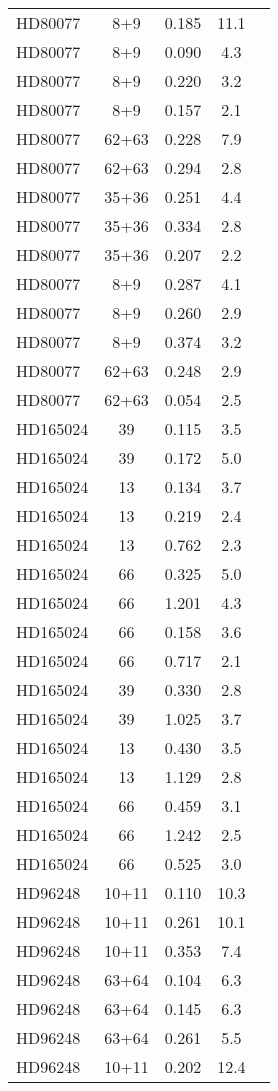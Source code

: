 \begin{table*}
\begin{tabular}{l c c c c}
HD80077 & 8+9 & 0.185 & 11.1\\ 
HD80077 & 8+9 & 0.090 & 4.3\\ 
HD80077 & 8+9 & 0.220 & 3.2\\ 
HD80077 & 8+9 & 0.157 & 2.1\\ 
HD80077 & 62+63 & 0.228 & 7.9\\ 
HD80077 & 62+63 & 0.294 & 2.8\\ 
HD80077 & 35+36 & 0.251 & 4.4\\ 
HD80077 & 35+36 & 0.334 & 2.8\\ 
HD80077 & 35+36 & 0.207 & 2.2\\ 
HD80077 & 8+9 & 0.287 & 4.1\\ 
HD80077 & 8+9 & 0.260 & 2.9\\ 
HD80077 & 8+9 & 0.374 & 3.2\\ 
HD80077 & 62+63 & 0.248 & 2.9\\ 
HD80077 & 62+63 & 0.054 & 2.5\\ 
\hline
HD165024 & 39 & 0.115 & 3.5\\ 
HD165024 & 39 & 0.172 & 5.0\\ 
HD165024 & 13 & 0.134 & 3.7\\ 
HD165024 & 13 & 0.219 & 2.4\\ 
HD165024 & 13 & 0.762 & 2.3\\ 
HD165024 & 66 & 0.325 & 5.0\\ 
HD165024 & 66 & 1.201 & 4.3\\ 
HD165024 & 66 & 0.158 & 3.6\\ 
HD165024 & 66 & 0.717 & 2.1\\ 
HD165024 & 39 & 0.330 & 2.8\\ 
HD165024 & 39 & 1.025 & 3.7\\ 
HD165024 & 13 & 0.430 & 3.5\\ 
HD165024 & 13 & 1.129 & 2.8\\ 
HD165024 & 66 & 0.459 & 3.1\\ 
HD165024 & 66 & 1.242 & 2.5\\ 
HD165024 & 66 & 0.525 & 3.0\\ 
\hline
HD96248 & 10+11 & 0.110 & 10.3\\ 
HD96248 & 10+11 & 0.261 & 10.1\\ 
HD96248 & 10+11 & 0.353 & 7.4\\ 
HD96248 & 63+64 & 0.104 & 6.3\\ 
HD96248 & 63+64 & 0.145 & 6.3\\ 
HD96248 & 63+64 & 0.261 & 5.5\\ 
HD96248 & 10+11 & 0.202 & 12.4\\ 

\end{tabular}
\end{table*}
